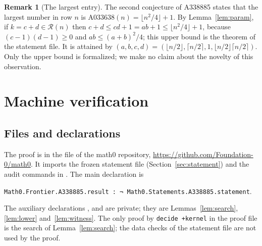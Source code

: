 \documentclass[11pt]{amsart}
\theoremstyle{plain}
\theoremstyle{definition}
\newtheorem{remark}[theorem]{Remark}
\newcommand{\R}{\mathcal{R}}
\begin{document}
\begin{remark}[The largest entry]\label{rem:max}
The second conjecture of A338885 states that the largest number in row $n$ is A033638$(n)=\lfloor n^2/4\rfloor+1$. By Lemma~\ref{lem:param}, if $k=c+d\in\R(n)$ then $c+d\le cd+1=ab+1\le\lfloor n^2/4\rfloor+1$, because $(c-1)(d-1)\ge0$ and $ab\le(a+b)^2/4$; this upper bound is the theorem  of the statement file. It is attained by $(a,b,c,d)=(\lfloor n/2\rfloor,\lceil n/2\rceil,1,\lfloor n/2\rfloor\lceil n/2\rceil)$. Only the upper bound is formalized; we make no claim about the novelty of this observation.
\end{remark}

\section{Machine verification}\label{sec:lean}

\subsection*{Files and declarations}
The proof is in the file  of the math0 repository, \url{https://github.com/Foundation-0/math0}. It imports the frozen statement file  (Section~\ref{sec:statement}) and the audit commands in . The main declaration is
\begin{center}
\texttt{Math0.Frontier.A338885.result :\ ¬ Math0.Statements.A338885.statement}.
\end{center}
The auxiliary declarations ,  and  are private; they are Lemmas~\ref{lem:search}, \ref{lem:lower} and~\ref{lem:witness}. The only proof by \texttt{decide +kernel} in the proof file is the search of Lemma~\ref{lem:search}; the data checks of the statement file are not used by the proof.
\end{document}

